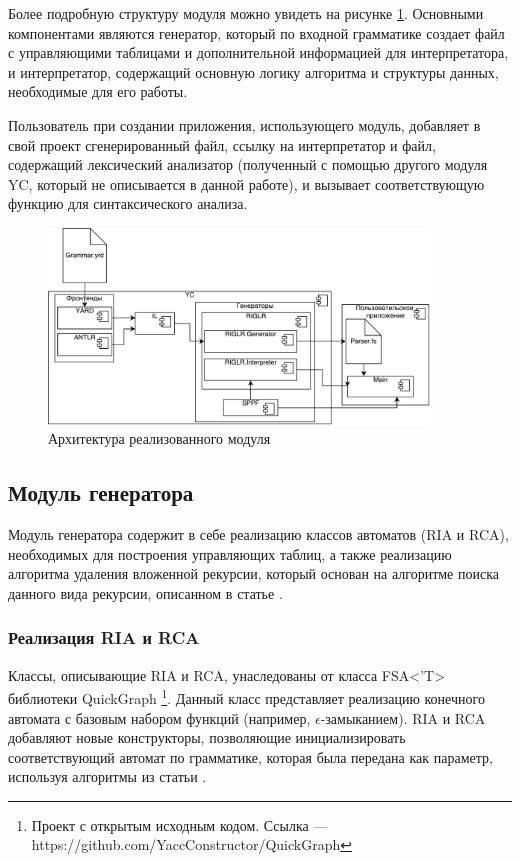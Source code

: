 \documentclass[14pt]{matmex-diploma-custom}
\begin{document}
Более подробную структуру модуля можно увидеть на рисунке \ref{RIGLRArch}. Основными компонентами являются генератор, который по входной грамматике создает файл с управляющими таблицами и дополнительной информацией для интерпретатора, и интерпретатор, содержащий основную логику алгоритма и структуры данных, необходимые для его работы.

Пользователь при создании приложения, использующего модуль, добавляет в свой проект сгенерированный файл, ссылку на интерпретатор и файл, содержащий лексический анализатор (полученный с помощью другого модуля YC, который не описывается в данной работе), и вызывает соответствующую функцию для синтаксического анализа.

\begin{figure}[h]
\centering
\includegraphics[width=0.9\textwidth]{pictures/RIGLRArch.pdf}
\caption{Архитектура реализованного модуля}
\label{RIGLRArch}
\end{figure} 

\subsection{Модуль генератора}
Модуль генератора содержит в себе реализацию классов автоматов (RIA и RCA), необходимых для построения управляющих таблиц, а также реализацию алгоритма удаления вложенной рекурсии, который основан на алгоритме поиска данного вида рекурсии, описанном в статье \cite{NSE}.

\subsubsection{Реализация RIA и RCA}
Классы, описывающие RIA и RCA, унаследованы от класса FSA<'T> библиотеки QuickGraph \footnote{Проект с открытым исходным кодом. Ссылка --- https://github.com/YaccConstructor/QuickGraph}. Данный класс представляет реализацию конечного автомата с базовым набором функций (например, $\epsilon$-замыканием). RIA и RCA добавляют новые конструкторы, позволяющие инициализировать соответствующий автомат по грамматике, которая была передана как параметр, используя алгоритмы из статьи \cite{riglr}.
\end{document}
